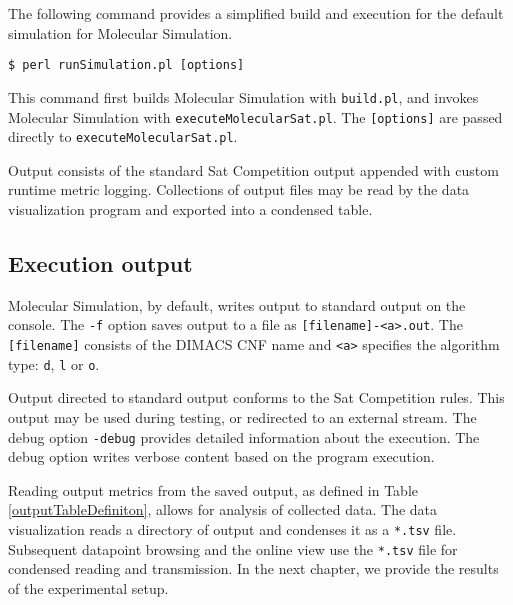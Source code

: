 
The following command provides a simplified build and execution for the default simulation for Molecular Simulation.

\begin{center}
\texttt{\$ perl runSimulation.pl [options]}
\end{center}

This command first builds Molecular Simulation with \texttt{build.pl}, and invokes Molecular Simulation with \texttt{executeMolecularSat.pl}.  The \texttt{[options]} are passed directly to \texttt{executeMolecularSat.pl}.

Output consists of the standard {\sc Sat} Competition output appended with custom runtime metric logging.  Collections of output files may be read by the data visualization program and exported into a condensed table. 

		\subsection{Execution output}


	Molecular Simulation, by default, writes output to standard output on the console.  The \texttt{-f} option saves output to a file as \texttt{[filename]-<a>.out}.  The \texttt{[filename]} consists of the DIMACS CNF name and \texttt{<a>} specifies the algorithm type: \texttt{d}, \texttt{l} or \texttt{o}.

	Output directed to standard output conforms to the {\sc Sat} Competition rules.  This output may be used during testing, or redirected to an external stream.  The debug option \texttt{-debug} provides detailed information about the execution.  The debug option writes verbose content based on the program execution.  

	Reading output metrics from the saved output, as defined in Table \ref{outputTableDefiniton}, allows for analysis of collected data.  The data visualization reads a directory of output and condenses it as a \texttt{*.tsv} file.  Subsequent datapoint browsing and the online view use the \texttt{*.tsv} file for condensed reading and transmission.  In the next chapter, we provide the results of the experimental setup.
